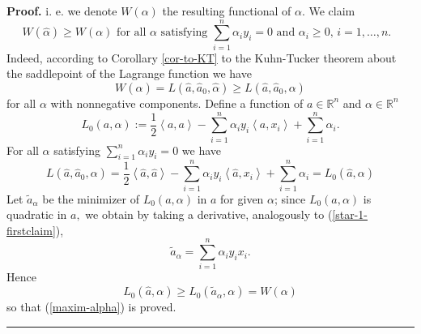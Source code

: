 \documentclass[11pt,twoside]{article}%
\theoremstyle{change}
\newenvironment{proof}[1][Proof]{\textbf{#1.} }{\ \rule{0.5em}{0.5em}}
\begin{document}
\begin{proof}
i. e. we denote $W(\alpha)$ the resulting functional of $\alpha$. We claim
\begin{equation}
W(\hat{\alpha})\geq W(\alpha)\text{ for all }\alpha\text{ satisfying }%
\sum_{i=1}^{n}\alpha_{i}y_{i}=0\text{ and }\alpha_{i}\geq0\text{, }%
i=1,\ldots,n.\text{ }\label{maxim-alpha}%
\end{equation}
Indeed, according to Corollary \ref{cor-to-KT} to the Kuhn-Tucker theorem
about the saddlepoint of the Lagrange function we have
\[
W(\hat{\alpha})=L\left(  \hat{a},\hat{a}_{0},\hat{\alpha}\right)  \geq
L\left(  \hat{a},\hat{a}_{0},\alpha\right)
\]
for all $\alpha$ with nonnegative components. Define a function of
$a\in\mathbb{R}^{n}$ and $\alpha\in\mathbb{R}^{n}$
\[
L_{0}\left(  a,\alpha\right)  :=\frac{1}{2}\left\langle a,a\right\rangle
-\sum_{i=1}^{n}\alpha_{i}y_{i}\left\langle a,x_{i}\right\rangle +\sum
_{i=1}^{n}\alpha_{i}.
\]
For all $\alpha$ satisfying $\sum_{i=1}^{n}\alpha_{i}y_{i}=0$ we have
\[
L\left(  \hat{a},\hat{a}_{0},\alpha\right)  =\frac{1}{2}\left\langle \hat
{a},\hat{a}\right\rangle -\sum_{i=1}^{n}\alpha_{i}y_{i}\left\langle \hat
{a},x_{i}\right\rangle +\sum_{i=1}^{n}\alpha_{i}=L_{0}\left(  \hat{a}%
,\alpha\right)
\]
Let $\tilde{a}_{\alpha}$ be the minimizer of $L_{0}\left(  a,\alpha\right)  $
in $a$ for given $\alpha$; since $L_{0}\left(  a,\alpha\right)  $ is quadratic
in $a,$ we obtain by taking a derivative, analogously to
(\ref{star-1-firstclaim}),
\[
\tilde{a}_{\alpha}=\sum_{i=1}^{n}\alpha_{i}y_{i}x_{i}.
\]
Hence
\[
L_{0}\left(  \hat{a},\alpha\right)  \geq L_{0}\left(  \tilde{a}_{\alpha
},\alpha\right)  =W(\alpha)
\]
so that (\ref{maxim-alpha}) is proved.
\end{proof}

\bigskip\bigskip
\end{document}
